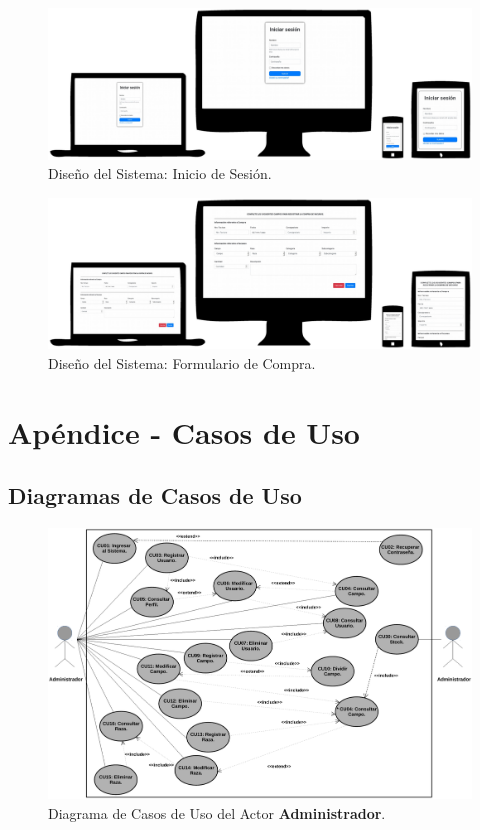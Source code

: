 \documentclass[11pt,oneside]{book}
\begin{document}
\begin{figure}[tbhp]
\centerline{\includegraphics[scale=0.7]{figs/loginForm.pdf}}
\caption{Diseño del Sistema: Inicio de Sesión.}
\label{fig204}
\end{figure}

\begin{figure}[tbhp]
\centerline{\includegraphics[scale=0.7]{figs/compraForm.pdf}}
\caption{Diseño del Sistema: Formulario de Compra.}
\label{fig205}
\end{figure}

\clearpage
\newpage
\section{Apéndice - Casos de Uso}\label{Ap}

\subsection{Diagramas de Casos de Uso}\label{ApDCU}
\begin{figure}[tbhp]
\centerline{\includegraphics[scale=0.5]{figs/Diagrama_CU_Administrador.pdf}}
\caption{Diagrama de Casos de Uso del Actor \textbf{Administrador}.}
\label{Ap101}
\end{figure}
\end{document}
